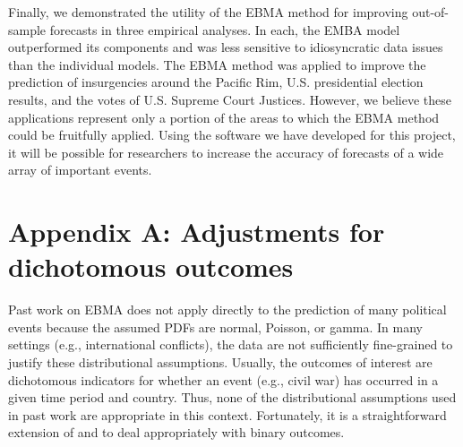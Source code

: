 Finally, we demonstrated the utility of the EBMA method for improving
out-of-sample forecasts in three empirical analyses.  In each, the
EMBA model outperformed its components and was less sensitive to
idiosyncratic data issues than the individual models.  The EBMA method
was applied to improve the prediction of insurgencies around the
Pacific Rim, U.S. presidential election results, and the votes of
U.S. Supreme Court Justices. However, we believe these applications
represent only a portion of the areas to which the EBMA method could
be fruitfully applied.  Using the software we have developed for this
project, it will be possible for researchers to increase the accuracy
of forecasts of a wide array of important events.



\newpage
\appendix


\section*{Appendix A: Adjustments for dichotomous outcomes}

Past work on EBMA does not apply directly to the prediction of many
political events because the assumed PDFs are normal, Poisson, or
gamma. In many settings (e.g., international conflicts), the data are
not sufficiently fine-grained to justify these distributional
assumptions.  Usually, the outcomes of interest are dichotomous
indicators for whether an event (e.g., civil war) has occurred in a
given time period and country. Thus, none of the distributional
assumptions used in past work are appropriate in this context.
Fortunately, it is a straightforward extension of
\citet{Sloughter:2007} and \citet{Sloughter:2010} to deal
appropriately with binary outcomes.


